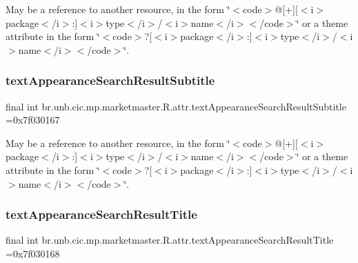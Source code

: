 May be a reference to another resource, in the form \char`\"{}$<$code$>$@\mbox{[}+\mbox{]}\mbox{[}$<$i$>$package$<$/i$>$\+:\mbox{]}$<$i$>$type$<$/i$>$/$<$i$>$name$<$/i$>$$<$/code$>$\char`\"{} or a theme attribute in the form \char`\"{}$<$code$>$?\mbox{[}$<$i$>$package$<$/i$>$\+:\mbox{]}$<$i$>$type$<$/i$>$/$<$i$>$name$<$/i$>$$<$/code$>$\char`\"{}. \mbox{\label{classbr_1_1unb_1_1cic_1_1mp_1_1marketmaster_1_1R_1_1attr_add573418608a1fd6781985f843e50816}} 
\subsubsection{\texorpdfstring{text\+Appearance\+Search\+Result\+Subtitle}{textAppearanceSearchResultSubtitle}}
{\footnotesize\ttfamily final int br.\+unb.\+cic.\+mp.\+marketmaster.\+R.\+attr.\+text\+Appearance\+Search\+Result\+Subtitle =0x7f030167\hspace{0.3cm}{\ttfamily [static]}}

May be a reference to another resource, in the form \char`\"{}$<$code$>$@\mbox{[}+\mbox{]}\mbox{[}$<$i$>$package$<$/i$>$\+:\mbox{]}$<$i$>$type$<$/i$>$/$<$i$>$name$<$/i$>$$<$/code$>$\char`\"{} or a theme attribute in the form \char`\"{}$<$code$>$?\mbox{[}$<$i$>$package$<$/i$>$\+:\mbox{]}$<$i$>$type$<$/i$>$/$<$i$>$name$<$/i$>$$<$/code$>$\char`\"{}. \mbox{\label{classbr_1_1unb_1_1cic_1_1mp_1_1marketmaster_1_1R_1_1attr_a067426526ad4e4db93140a44d98f26ba}} 
\subsubsection{\texorpdfstring{text\+Appearance\+Search\+Result\+Title}{textAppearanceSearchResultTitle}}
{\footnotesize\ttfamily final int br.\+unb.\+cic.\+mp.\+marketmaster.\+R.\+attr.\+text\+Appearance\+Search\+Result\+Title =0x7f030168\hspace{0.3cm}{\ttfamily [static]}}

